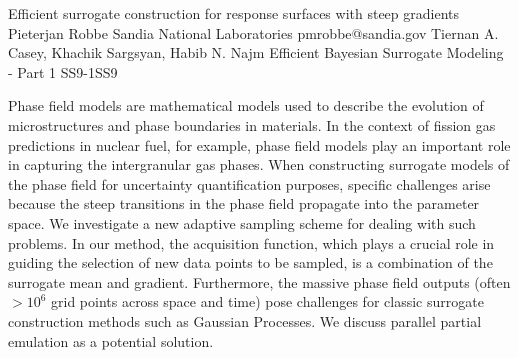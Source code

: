 \begin{talk}
  {Efficient surrogate construction for response surfaces with steep gradients}%
  {Pieterjan Robbe}%
  {Sandia National Laboratories}%
  {pmrobbe@sandia.gov}%
  {Tiernan A. Casey, Khachik Sargsyan, Habib N. Najm}%
{Efficient Bayesian Surrogate Modeling - Part 1}
{}{SS9-1}{SS9}


				
				

Phase field models are mathematical models used to describe the evolution of microstructures and phase boundaries in materials. In the context of fission gas predictions in nuclear fuel, for example, phase field models play an important role in capturing the intergranular gas phases. When constructing surrogate models of the phase field for uncertainty quantification purposes, specific challenges arise because the steep transitions in the phase field propagate into the parameter space. We investigate a new adaptive sampling scheme for dealing with such problems. In our method, the acquisition function, which plays a crucial role in guiding the selection of new data points to be sampled, is a combination of the surrogate mean and gradient. Furthermore, the massive phase field outputs (often $> 10^6$ grid points across space and time) pose challenges for classic surrogate construction methods such as Gaussian Processes. We discuss parallel partial emulation as a potential solution.
\end{talk}

